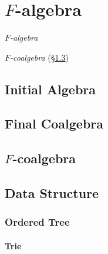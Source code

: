 


\section{$F$-algebra}\label{sec:f_algebra}

\emph{$F$-algebra}

\emph{$F$-coalgebra} (\S\ref{sec:f_coalgebra})



\subsection{Initial Algebra}\label{sec:initial_algebra}

\subsection{Final Coalgebra}\label{sec:final_coalgebra}

\subsection{$F$-coalgebra}\label{sec:f_coalgebra}

\subsection{Data Structure}\label{sec:data_structure}

\subsubsection{Ordered Tree}\label{sec:ordered_tree}

\paragraph{Trie}\label{sec:trie}

